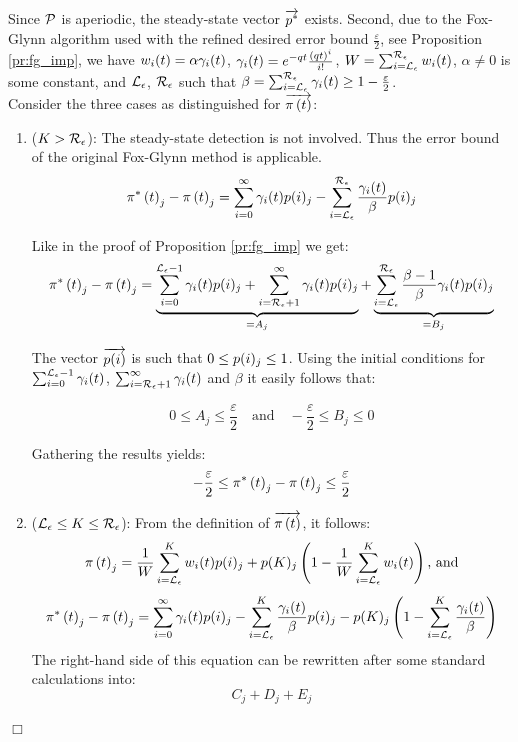 \documentclass[a4paper,11pt]{article}
\newenvironment{proof}{\trivlist \item[\hskip \labelsep{\bf Proof}]}{\hfill\hbox{$\Box$}\endtrivlist}
\begin{document}
		\begin{proof}
			Since $\mathcal{P}$ is aperiodic, the steady-state vector $\overrightarrow{p^{*}}$ exists. 
			Second, due to the Fox-Glynn algorithm used with the refined desired error bound $\frac{\varepsilon}{2}$, see Proposition \ref{pr:fg_imp}, we have $w_{i}(t) = \alpha \gamma_{i}(t)$, $\gamma_{i}(t) = e^{-q t}\frac{\left( q t \right)^{i}}{i!} $, $W = \sum_{i = \mathcal{L}_{\epsilon}}^{\mathcal{R}_{\epsilon}} w_{i}(t)$, $\alpha \neq 0$ is some constant, and $\mathcal{L}_{\epsilon}$, $\mathcal{R}_{\epsilon}$ such that $\beta = \sum_{i=\mathcal{L}_{\epsilon}}^{\mathcal{R}_{\epsilon}} \gamma_{i}(t) \geq 1 - \frac{\varepsilon}{2}$.\\
			Consider the three cases as distinguished for $\overrightarrow{\pi \left( t \right) }$:
			\begin{enumerate}

				\item ($K > \mathcal{R}_{\epsilon}$): The steady-state detection is not involved. Thus the error bound of the original Fox-Glynn method is applicable.
					\begin{equation}
						\pi^{*} \left( t \right)_{j} - \pi \left( t \right)_{j} =\sum_{i=0}^{\infty} \gamma_{i}(t) p(i)_{j} - \sum_{i=\mathcal{L}_{\epsilon}}^{\mathcal{R}_{\epsilon}}\frac{\gamma_{i}(t)}{\beta} p(i)_{j} \nonumber
					\end{equation}

					Like in the proof of Proposition \ref{pr:fg_imp} we get:
					\begin{equation}
						\pi^{*} \left( t \right)_{j} - \pi \left( t \right)_{j} = \underbrace{\sum_{i=0}^{\mathcal{L}_{\epsilon}-1} \gamma_{i}(t) p(i)_{j} + \sum_{i=\mathcal{R}_{\epsilon}+1}^{\infty} \gamma_{i}(t) p(i)_{j}}_{=A_j} + \underbrace{\sum_{i=\mathcal{L}_{\epsilon}}^{\mathcal{R}_{\epsilon}}\frac{\beta - 1}{\beta} \gamma_{i}(t) p(i)_{j}}_{=B_j} \nonumber
					\end{equation}
					
					The vector $\overrightarrow{p(i)}$ is such that $0 \leq p(i)_{j} \leq 1$. Using the initial conditions for $\sum_{i=0}^{\mathcal{L}_{\epsilon}-1} \gamma_{i}(t) $, $\sum_{i=\mathcal{R}_{\epsilon}+1}^{\infty} \gamma_{i}(t) $ and $\beta$ it easily follows that:
					
					$$
						0 \leq A_{j} \leq \frac{\varepsilon}{2} \quad 
						   \text{and} \quad
						- \frac{\varepsilon}{2} \leq B_{j} \leq 0
					$$

					Gathering the results yields:
					\begin{equation}
						- \frac{\varepsilon}{2} \leq \pi^{*} \left( t \right)_{j} - \pi \left( t \right)_{j} \leq \frac{\varepsilon}{2}
					\end{equation}

				\item ($\mathcal{L}_{\epsilon} \leq K \leq \mathcal{R}_{\epsilon}$): From the definition of $\overrightarrow{\pi \left( t \right) }$, it follows:
					\begin{equation}
						\pi \left( t \right)_{j} = \frac{1}{W} \sum_{i=\mathcal{L}_{\epsilon}}^{K}w_{i}(t) p(i)_{j} + p(K)_{j} \left(1- \frac{1}{W} \sum_{i=\mathcal{L}_{\epsilon}}^{K}w_{i}(t) \right) \nonumber \text{, and}
					\end{equation}
					\begin{equation}
						\pi^{*} \left( t \right)_{j} - \pi \left( t \right)_{j} = \sum_{i=0}^{\infty} \gamma_{i}(t) p(i)_{j} - \sum_{i=\mathcal{L}_{\epsilon}}^{K}\frac{\gamma_{i}(t)}{\beta} p(i)_{j} - p(K)_{j} \left(1 - \sum_{i=\mathcal{L}_{\epsilon}}^{K}\frac{\gamma_{i}(t)}{\beta} \right) \nonumber
					\end{equation}
						The right-hand side of this equation can be rewritten after some standard calculations into:
					\begin{equation}
						C_{j} + D_{j} + E_{j} \nonumber
					\end{equation}


\end{enumerate}
\end{proof}
\end{document}
